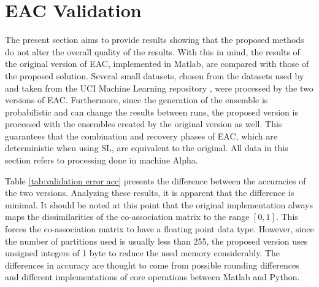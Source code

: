 \section{EAC Validation}
\label{sec:eac validation}

The present section aims to provide results showing that the proposed methods do not alter the overall quality of the results.
With this in mind, the results of the original version of EAC, implemented in Matlab, are compared with those of the proposed solution.
Several small datasets, chosen from the datasets used by \citet{Lourenco2010} and taken from the UCI Machine Learning repository \cite{Lichman:2013}, were processed by the two versions of EAC.
Furthermore, since the generation of the ensemble is probabilistic and can change the results between runs, the proposed version is processed with the ensembles created by the original version as well.
This guarantees that the combination and recovery phases of EAC, which are deterministic when using SL, are equivalent to the original.
All data in this section refers to processing done in machine Alpha.

Table \ref{tab:validation error acc} presents the difference between the accuracies of the two versions.
Analyzing these results, it is apparent that the difference is minimal.
It should be noted at this point that the original implementation always maps the dissimilarities of the co-association matrix to the range $\left [ 0 , 1 \right ]$.
This forces the co-association matrix to have a floating point data type.
However, since the number of partitions used is usually less than 255, the proposed version uses unsigned integers of 1 byte to reduce the used memory considerably.
The differences in accuracy are thought to come from possible rounding differences and different implementations of core operations between Matlab and Python.

